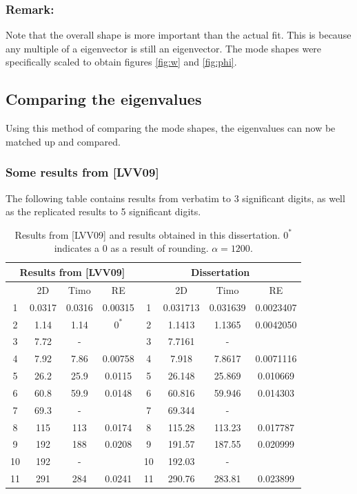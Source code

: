 \documentclass[../../main.tex]{subfiles}
\begin{document}
\subsubsection{Remark:} Note that the overall shape is more important than the actual fit. This is because any multiple of a eigenvector is still an eigenvector. The mode shapes were specifically scaled to obtain figures \ref{fig:w} and \ref{fig:phi}.

\subsection{Comparing the eigenvalues}
Using this method of comparing the mode shapes, the eigenvalues can now be matched up and compared.

\subsubsection{Some results from [LVV09]}
The following table contains results from \cite{LVV09} verbatim to 3 significant digits, as well as the replicated results to 5 significant digits.

\begin{table}[!ht]
	\centering
	\caption{Results from [LVV09] and results obtained in this dissertation. $0^*$ indicates a 0 as a result of rounding. $\alpha = 1200$.}
	\begin{tabular}{|c|c|c|c||c|c|c|c|}
		\hline
		\multicolumn{4}{|c||}{Results from [LVV09]} & \multicolumn{4}{c|}{Dissertation} \\ \hline \hline
		~ & 2D & Timo & RE & ~ & 2D & Timo & RE  \\ \hline
		1 & 0.0317 & 0.0316 & 0.00315 & 1 & 0.031713 & 0.031639 & 0.0023407  \\ 
		2 & 1.14 & 1.14 & $0^*$ & 2 & 1.1413 & 1.1365 &  0.0042050 \\ 
		3 & 7.72 & - & ~ & 3 & 7.7161 & - &   \\ 
		4 & 7.92 & 7.86 & 0.00758 & 4 & 7.918 & 7.8617 & 0.0071116    \\ 
		5 & 26.2 & 25.9 & 0.0115 & 5 & 26.148 & 25.869 & 0.010669  \\ 
		6 & 60.8 & 59.9 & 0.0148 & 6 & 60.816 & 59.946 & 0.014303  \\ 
		7 & 69.3 & - & ~ & 7 & 69.344 & - &    \\ 
		8 & 115 & 113 & 0.0174 & 8 & 115.28 & 113.23 &  0.017787  \\ 
		9 & 192 & 188 & 0.0208 & 9 & 191.57 & 187.55 &  0.020999  \\ 
		10 & 192 & - &  & 10 & 192.03 & - &   \\ 
		11 & 291 & 284 & 0.0241 & 11 & 290.76 & 283.81 &  0.023899  \\ \hline
	\end{tabular}\label{Results_LVV09}
\end{table}
\end{document}
